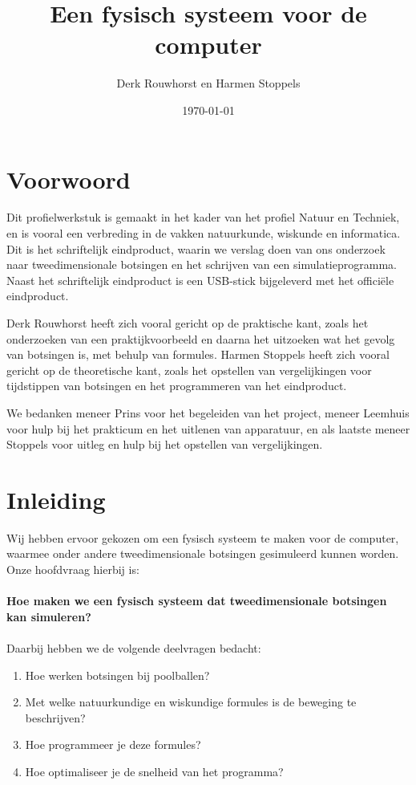 \documentclass[12pt,a4paper]{article}
\title{Een fysisch systeem voor de computer}
\date{\today}
\author{Derk Rouwhorst en Harmen Stoppels}
\begin{document}
	\begin{titlepage}
		\maketitle
		\thispagestyle{empty}
	\end{titlepage}

	\tableofcontents
	\newpage
	
	\section{Voorwoord}
	Dit profielwerkstuk is gemaakt in het kader van het profiel Natuur en Techniek, en is vooral een verbreding in de vakken natuurkunde, wiskunde en informatica. Dit is het schriftelijk eindproduct, waarin we verslag doen van ons onderzoek naar tweedimensionale botsingen en het schrijven van een simulatieprogramma. Naast het schriftelijk eindproduct is een USB-stick bijgeleverd met het offici\"{e}le eindproduct.
	
	Derk Rouwhorst heeft zich vooral gericht op de praktische kant, zoals het onderzoeken van een praktijkvoorbeeld en daarna het uitzoeken wat het gevolg van botsingen is, met behulp van formules. Harmen Stoppels heeft zich vooral gericht op de theoretische kant, zoals het opstellen van vergelijkingen voor tijdstippen van botsingen en het programmeren van het eindproduct.
	
	We bedanken meneer Prins voor het begeleiden van het project, meneer Leemhuis voor hulp bij het prakticum en het uitlenen van apparatuur, en als laatste meneer Stoppels voor uitleg en hulp bij het opstellen van vergelijkingen.
	
	\newpage
		
	\section{Inleiding}
	Wij hebben ervoor gekozen om een fysisch systeem te maken voor de computer, waarmee onder andere tweedimensionale botsingen gesimuleerd kunnen worden. Onze hoofdvraag hierbij is:
	\\
	\\\textbf{Hoe maken we een fysisch systeem dat tweedimensionale botsingen kan simuleren?}
	\\
	\\Daarbij hebben we de volgende deelvragen bedacht:

	\begin{enumerate}
		\item Hoe werken botsingen bij poolballen?
		\item Met welke natuurkundige en wiskundige formules is de beweging te beschrijven?
		\item Hoe programmeer je deze formules?
		\item Hoe optimaliseer je de snelheid van het programma?
	\end{enumerate}
\end{document}
